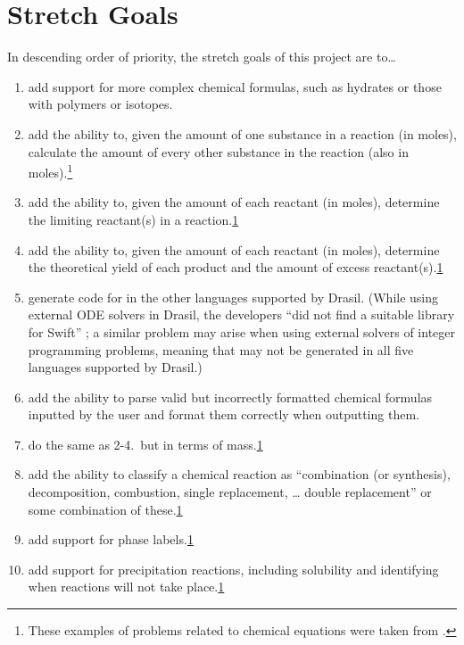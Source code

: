 \documentclass{article}
\begin{document}
\section{Stretch Goals}

In descending order of priority, the stretch goals of this project are to\dots

\begin{enumerate}
	\item add support for more complex chemical formulas, such as hydrates or
	      those with polymers or isotopes.
	\item add the ability to, given the amount of one substance in a reaction
	      (in moles), calculate the amount of every other substance in the
	      reaction (also in moles).\footnote{\label{chemProbExs}These examples
		      of problems related to chemical equations were taken from
		      \cite{lund_introduction_2023}.}
	\item add the ability to, given the amount of each reactant (in moles),
	      determine the limiting reactant(s) in a reaction.\cref{chemProbExs}
	\item add the ability to, given the amount of each reactant (in moles),
	      determine the theoretical yield of each product and the amount of
	      excess reactant(s).\cref{chemProbExs}
	\item generate code for \progname{} in the other languages supported by
	      Drasil. (While using external ODE solvers in Drasil, the developers
	      ``did not find a suitable library for Swift''
	      \cite[p.~24]{chen_solving_2022}; a similar problem may arise when
	      using external solvers of integer programming problems,
	      meaning that \progname{} may not be generated in all five languages
	      supported by Drasil.)
	\item add the ability to parse valid but incorrectly formatted chemical
	      formulas inputted by the user and format them correctly when
	      outputting them.
	\item do the same as 2-4.~but in terms of mass.\cref{chemProbExs}
	\item add the ability to classify a chemical reaction as ``combination (or
	      synthesis), decomposition, combustion, single replacement, \dots
	      double replacement'' \cite[p.~301]{lund_introduction_2023} or some
	      combination of these.\cref{chemProbExs}
	\item add support for phase labels.\cref{chemProbExs}
	\item add support for precipitation reactions, including solubility and
	      identifying when reactions will not take place.\cref{chemProbExs}
\end{enumerate}

\newpage



\end{document}
